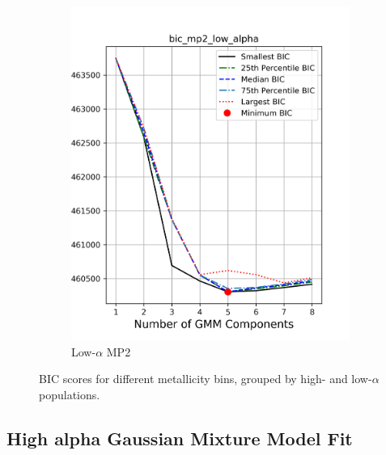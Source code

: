 \documentclass[a4paper,12pt]{article}
\begin{document}
\begin{figure}[htbp]
\begin{subfigure}[t]{0.24\textwidth}
        \includegraphics[width=\textwidth]{../figures/bic_mp2_low_alpha.png}
        \caption{Low-$\alpha$ MP2}
    \end{subfigure}

    \caption{BIC scores for different metallicity bins, grouped by high- and low-$\alpha$ populations.}
    \label{fig:bic_grid}
\end{figure}


\subsection{High alpha Gaussian Mixture Model Fit}
\end{document}
